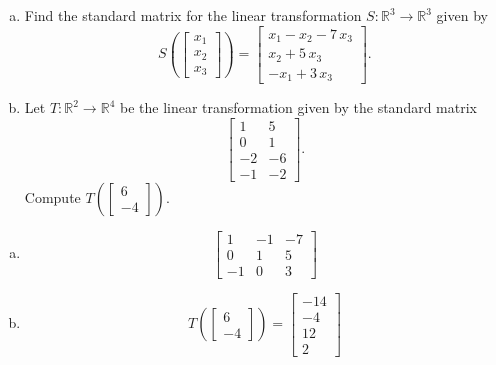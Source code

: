 
\begin{exerciseStatement}

\begin{enumerate}[(a)]
\item Find the standard matrix for the linear transformation \(S:\mathbb{R}^ 3  \to \mathbb{R}^ 3 \) given by \[S\left(  \left[\begin{array}{c}
x_{1} \\
x_{2} \\
x_{3}
\end{array}\right]  \right) =  \left[\begin{array}{c}
x_{1} - x_{2} - 7 \, x_{3} \\
x_{2} + 5 \, x_{3} \\
-x_{1} + 3 \, x_{3}
\end{array}\right] .\]
\item Let \(T:\mathbb{R}^ 2  \to \mathbb{R}^ 4 \) be the linear transformation given by the standard matrix \[ \left[\begin{array}{cc}
1 & 5 \\
0 & 1 \\
-2 & -6 \\
-1 & -2
\end{array}\right] .\] Compute \(T\left( \left[\begin{array}{c}
6 \\
-4
\end{array}\right]  \right)\). 
\end{enumerate}
    
\end{exerciseStatement}
    
\begin{exerciseAnswer} 

\begin{enumerate}[(a)]
\item \[ \left[\begin{array}{ccc}
1 & -1 & -7 \\
0 & 1 & 5 \\
-1 & 0 & 3
\end{array}\right] \]
\item \[T\left( \left[\begin{array}{c}
6 \\
-4
\end{array}\right]  \right)= \left[\begin{array}{c}
-14 \\
-4 \\
12 \\
2
\end{array}\right] \]
\end{enumerate}
    
\end{exerciseAnswer}
    
